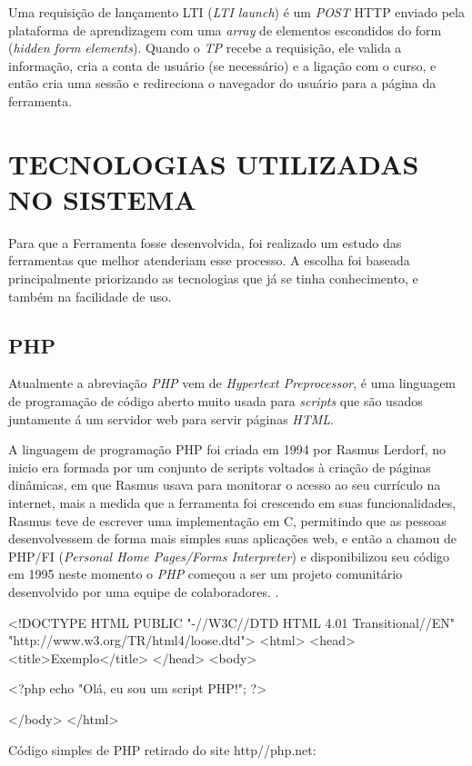 Uma requisição de lançamento LTI (\textit{LTI launch}) é um \textit{POST} \ac{HTTP} enviado pela plataforma de aprendizagem com uma \textit{array} de elementos escondidos do form (\textit{hidden form elements}). Quando o \textit{TP} recebe a requisição, ele valida a informação, cria a conta de usuário (se necessário) e a ligação com o curso, e então cria uma sessão e redireciona o navegador do usuário para a página da ferramenta.

\chapter{TECNOLOGIAS UTILIZADAS NO SISTEMA}

Para que a Ferramenta fosse desenvolvida, foi realizado um estudo das ferramentas que melhor atenderiam esse processo. A escolha foi baseada principalmente priorizando as tecnologias que já se tinha conhecimento, e também na facilidade de uso.

\section{PHP}

Atualmente a abreviação \textit{PHP} vem de \textit{Hypertext Preprocessor}, é uma linguagem de programação de código aberto muito usada para \textit{scripts} que são usados juntamente á um servidor web para servir páginas \textit{HTML}.

A linguagem de programação PHP foi criada em 1994 por Rasmus Lerdorf, no inicio era formada por um conjunto de scripts voltados à criação de páginas dinâmicas, em que Rasmus usava para monitorar o acesso ao seu currículo na internet, mais a medida que a ferramenta foi crescendo em suas funcionalidades, Rasmus teve de escrever uma implementação em C, permitindo que as pessoas desenvolvessem de forma mais simples suas aplicações web, e então a chamou de PHP/FI (\textit{Personal Home Pages/Forms Interpreter}) e disponibilizou seu código em 1995 neste momento o \textit{PHP} começou a ser um projeto comunitário desenvolvido por uma equipe de colaboradores. \cite[p.~20]{pablo-php}.

\begin{listing}
    \begin{phpcode}
    <!DOCTYPE HTML PUBLIC "-//W3C//DTD HTML 4.01 Transitional//EN"
    "http://www.w3.org/TR/html4/loose.dtd">
    <html>
        <head>
            <title>Exemplo</title>
        </head>
        <body>

        <?php
            echo "Olá, eu sou um script PHP!";
        ?>

        </body>
    </html>
    \end{phpcode}
    \caption{Código simples de PHP retirado do site http//php.net:}
    \label{lst:php_example_1}
\end{listing}

